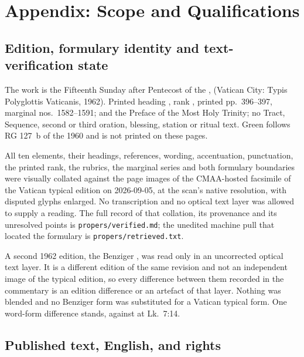 \sectionguard
\section*{Appendix: Scope and Qualifications}

\editionnote

\subsection*{Edition, formulary identity and text-verification state}

The work is the Fifteenth Sunday after Pentecost of the ,  (Vatican City: Typis Polyglottis Vaticanis,
1962). Printed heading , rank
, printed pp.~396--397, marginal nos.\ 1582--1591; 
and the Preface of the Most Holy Trinity; no Tract, Sequence, second or third
oration, blessing, station or ritual text. Green follows RG 127~b of the 1960
 and is not printed on these pages.

All ten elements, their headings, references, wording, accentuation, punctuation,
the printed rank, the rubrics, the marginal series and both formulary boundaries
were visually collated against the page images of the CMAA-hosted facsimile of
the Vatican typical edition on 2026-09-05, at the scan's native resolution, with
disputed glyphs enlarged. No transcription and no optical text layer was allowed
to supply a reading. The full record of that collation, its provenance and its
unresolved points is \texttt{propers/verified.md}; the unedited machine pull that
located the formulary is \texttt{propers/retrieved.txt}.

A second 1962 edition, the Benziger , was read only in an
uncorrected optical text layer. It is a different edition of the same revision and
not an independent image of the typical edition, so every difference between them
recorded in the commentary is an edition difference or an artefact of that layer.
Nothing was blended and no Benziger form was substituted for a Vatican typical
form. One word-form difference stands,  against
 at Lk.\ 7:14.

\subsection*{Published text, English, and rights}

